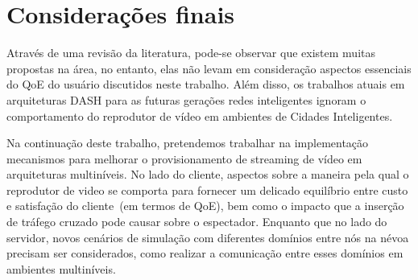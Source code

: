 \clearpage
\section{Considerações finais}
\label{ch:remarks}

Através de uma revisão da literatura, pode-se observar que existem muitas propostas na área, no entanto, elas não levam em consideração aspectos essenciais do QoE do usuário discutidos neste trabalho. Além disso, os trabalhos atuais em arquiteturas DASH para as futuras gerações redes inteligentes ignoram o comportamento do reprodutor de vídeo em ambientes de Cidades Inteligentes. 

Na continuação deste trabalho, pretendemos trabalhar na implementação mecanismos para melhorar o provisionamento de streaming de vídeo em arquiteturas multiníveis. 
No lado do cliente, aspectos sobre a maneira pela qual o reprodutor de video se comporta para fornecer um delicado equilíbrio entre custo e satisfação do cliente~(em termos de QoE), bem como o impacto que a inserção de tráfego cruzado pode causar sobre o espectador. 
Enquanto que no lado do servidor, novos cenários de simulação com diferentes domínios entre nós na névoa precisam ser considerados, como realizar a comunicação entre esses domínios em ambientes multiníveis. 










